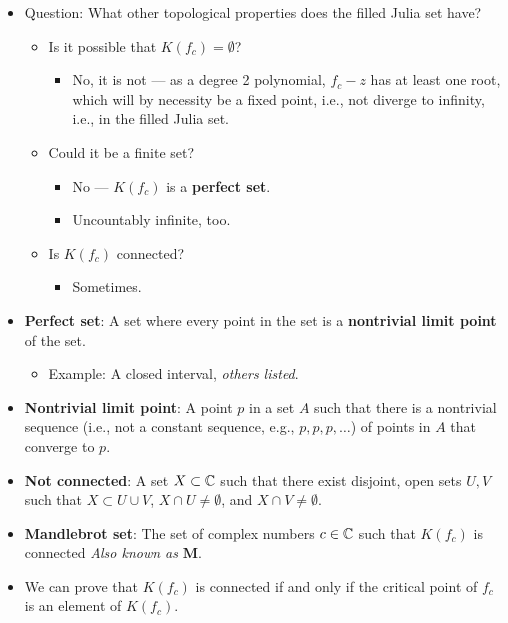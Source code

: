 \documentclass[../main.tex]{subfiles}
\begin{document}
\begin{itemize}
    \item Question: What other topological properties does the filled Julia set have?
    \begin{itemize}
        \item Is it possible that $K(f_c)=\emptyset$?
        \begin{itemize}
            \item No, it is not --- as a degree 2 polynomial, $f_c-z$ has at least one root, which will by necessity be a fixed point, i.e., not diverge to infinity, i.e., in the filled Julia set.
        \end{itemize}
        \item Could it be a finite set?
        \begin{itemize}
            \item No --- $K(f_c)$ is a \textbf{perfect set}.
            \item Uncountably infinite, too.
        \end{itemize}
        \item Is $K(f_c)$ connected?
        \begin{itemize}
            \item Sometimes.
        \end{itemize}
    \end{itemize}
    \item \textbf{Perfect set}: A set where every point in the set is a \textbf{nontrivial limit point} of the set.
    \begin{itemize}
        \item Example: A closed interval, \emph{others listed}.
    \end{itemize}
    \item \textbf{Nontrivial limit point}: A point $p$ in a set $A$ such that there is a nontrivial sequence (i.e., not a constant sequence, e.g., $p,p,p,\dots$) of points in $A$ that converge to $p$.
    \item \textbf{Not connected}: A set $X\subset\mathbb{C}$ such that there exist disjoint, open sets $U,V$ such that $X\subset U\cup V$, $X\cap U\neq\emptyset$, and $X\cap V\neq\emptyset$.
    \item \textbf{Mandlebrot set}: The set of complex numbers $c\in\mathbb{C}$ such that $K(f_c)$ is connected \emph{Also known as} $\bm{M}$.
    \item We can prove that $K(f_c)$ is connected if and only if the critical point of $f_c$ is an element of $K(f_c)$.
    \begin{itemize}

\end{itemize}
\end{itemize}
\end{document}
